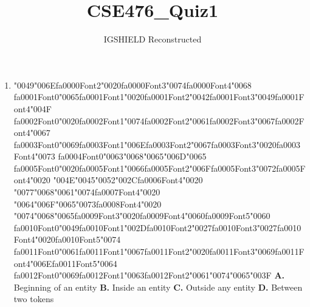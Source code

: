 \documentclass[11pt]{article}
\title{CSE476\_Quiz1}
\author{IGSHIELD Reconstructed}
\date{}
\begin{document}
\maketitle
\begin{enumerate}[leftmargin=*]
  \item {\char"0049}{\char"006E}{\csname fa0000Font2\endcsname\char"0020}{\csname fa0000Font3\endcsname\char"0074}{\csname fa0000Font4\endcsname\char"0068} {\csname fa0001Font0\endcsname\char"0065}{\csname fa0001Font1\endcsname\char"0020}{\csname fa0001Font2\endcsname\char"0042}{\csname fa0001Font3\endcsname\char"0049}{\csname fa0001Font4\endcsname\char"004F} {\csname fa0002Font0\endcsname\char"0020}{\csname fa0002Font1\endcsname\char"0074}{\csname fa0002Font2\endcsname\char"0061}{\csname fa0002Font3\endcsname\char"0067}{\csname fa0002Font4\endcsname\char"0067} {\csname fa0003Font0\endcsname\char"0069}{\csname fa0003Font1\endcsname\char"006E}{\csname fa0003Font2\endcsname\char"0067}{\csname fa0003Font3\endcsname\char"0020}{\csname fa0003Font4\endcsname\char"0073} {\csname fa0004Font0\endcsname\char"0063}{\char"0068}{\char"0065}{\char"006D}{\char"0065} {\csname fa0005Font0\endcsname\char"0020}{\csname fa0005Font1\endcsname\char"0066}{\csname fa0005Font2\endcsname\char"006F}{\csname fa0005Font3\endcsname\char"0072}{\csname fa0005Font4\endcsname\char"0020} {\char"004E}{\char"0045}{\char"0052}{\char"002C}{\csname fa0006Font4\endcsname\char"0020} {\char"0077}{\char"0068}{\char"0061}{\char"0074}{\csname fa0007Font4\endcsname\char"0020} {\char"0064}{\char"006F}{\char"0065}{\char"0073}{\csname fa0008Font4\endcsname\char"0020} {\char"0074}{\char"0068}{\char"0065}{\csname fa0009Font3\endcsname\char"0020}{\csname fa0009Font4\endcsname\char"0060}{\csname fa0009Font5\endcsname\char"0060} {\csname fa0010Font0\endcsname\char"0049}{\csname fa0010Font1\endcsname\char"002D}{\csname fa0010Font2\endcsname\char"0027}{\csname fa0010Font3\endcsname\char"0027}{\csname fa0010Font4\endcsname\char"0020}{\csname fa0010Font5\endcsname\char"0074} {\csname fa0011Font0\endcsname\char"0061}{\csname fa0011Font1\endcsname\char"0067}{\csname fa0011Font2\endcsname\char"0020}{\csname fa0011Font3\endcsname\char"0069}{\csname fa0011Font4\endcsname\char"006E}{\csname fa0011Font5\endcsname\char"0064} {\csname fa0012Font0\endcsname\char"0069}{\csname fa0012Font1\endcsname\char"0063}{\csname fa0012Font2\endcsname\char"0061}{\char"0074}{\char"0065}{\char"003F}
    \textbf{A.} Beginning of an entity
    \textbf{B.} Inside an entity
    \textbf{C.} Outside any entity
    \textbf{D.} Between two tokens


\end{enumerate}
\end{document}
